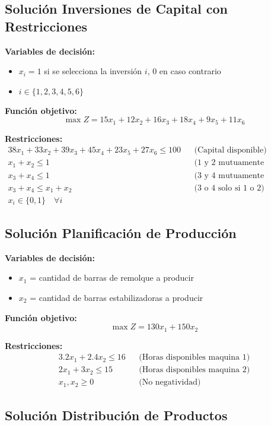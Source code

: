 \documentclass[12pt]{article}
\begin{document}
\subsection{Solución Inversiones de Capital con Restricciones}

\textbf{Variables de decisión:}
\begin{itemize}
    \item $x_i = 1$ si se selecciona la inversión $i$, 0 en caso contrario
    \item $i \in \{1, 2, 3, 4, 5, 6\}$
\end{itemize}

\textbf{Función objetivo:}
$$\max Z = 15x_1 + 12x_2 + 16x_3 + 18x_4 + 9x_5 + 11x_6$$

\textbf{Restricciones:}
\begin{align*}
    38x_1 + 33x_2 + 39x_3 + 45x_4 + 23x_5 + 27x_6 \leq 100 && \text{(Capital disponible)} \\
    x_1 + x_2 \leq 1 && \text{(1 y 2 mutuamente excluyentes)} \\
    x_3 + x_4 \leq 1 && \text{(3 y 4 mutuamente excluyentes)} \\
    x_3 + x_4 \leq x_1 + x_2 && \text{(3 o 4 solo si 1 o 2)} \\
    x_i \in \{0,1\} \quad \forall i
\end{align*}

\subsection{Solución Planificación de Producción}

\textbf{Variables de decisión:}
\begin{itemize}
    \item $x_1$ = cantidad de barras de remolque a producir
    \item $x_2$ = cantidad de barras estabilizadoras a producir
\end{itemize}

\textbf{Función objetivo:}
$$\max Z = 130x_1 + 150x_2$$

\textbf{Restricciones:}
\begin{align*}
    3.2x_1 + 2.4x_2 \leq 16 && \text{(Horas disponibles maquina 1)} \\
    2x_1 + 3x_2 \leq 15 && \text{(Horas disponibles maquina 2)} \\
    x_1, x_2 \geq 0 && \text{(No negatividad)}
\end{align*}

\subsection{Solución Distribución de Productos}
\end{document}
